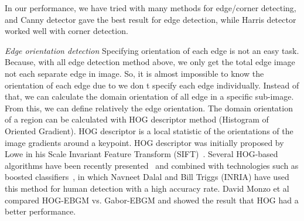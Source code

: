 In our performance, we have tried with many methods for
edge/corner detecting, and Canny detector gave the
best result for edge detection, while Harris detector worked well with
corner detection.

\textit{Edge orientation detection }
Specifying orientation of each edge is not an easy task. Because,
with all edge detection method above, we only get the total edge
image not each separate edge in image. So, it is almost impossible to
know the orientation of each edge due to we don t specify each edge
individually. Instead of that, we can calculate the domain orientation
of all edge in a specific sub-image. From this, we can define
relatively the edge orientation. The domain orientation of a region
can be calculated with HOG descriptor method (Histogram of
Oriented Gradient). HOG descriptor is a local statistic of the
orientations of the image gradients around a keypoint. HOG
descriptor was initially proposed by Lowe in his Scale Invariant
Feature Transform (SIFT)~\cite{lowe2004distintive}. Several HOG-based algorithms have
been recently presented~\cite{bay2008surf} and combined with technologies such as
boosted classifiers~\cite{dalal2005histograms}, in which Navneet Dalal and Bill Triggs (INRIA) have
used this method for human detection with a high accuracy rate.
David Monzo et al~\cite{monzo2008hog} compared HOG-EBGM vs. Gabor-EBGM
and showed the result that HOG had a better performance.

